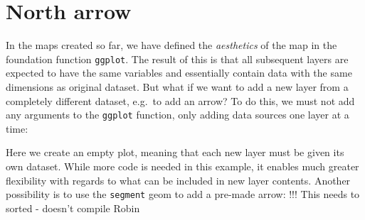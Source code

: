 \documentclass[]{article}
\begin{document}
\section{North arrow}

In the maps created so far, we have defined the \emph{aesthetics} of the
map in the foundation function \texttt{ggplot}. The result of this is
that all subsequent layers are expected to have the same variables and
essentially contain data with the same dimensions as original dataset.
But what if we want to add a new layer from a completely different
dataset, e.g.~to add an arrow? To do this, we must not add any arguments
to the \texttt{ggplot} function, only adding data sources one layer at a
time:

Here we create an empty plot, meaning that each new layer must be given
its own dataset. While more code is needed in this example, it enables
much greater flexibility with regards to what can be included in new
layer contents. Another possibility is to use the \texttt{segment} geom
to add a pre-made arrow: !!! This needs to sorted - doesn't compile
Robin
\end{document}
